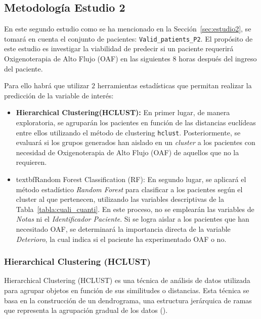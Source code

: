 \subsection{Metodología Estudio 2}\label{sec:metodologia-estudio-2}

En este segundo estudio como se ha mencionado en la Sección~\ref{sec:estudio2}, se tomará en cuenta el conjunto de pacientes: \texttt{Valid\_patients\_P2}. El propósito de este estudio es investigar la viabilidad de predecir si un paciente requerirá Oxigenoterapia de Alto Flujo (OAF) en las siguientes $8$ horas después del ingreso del paciente.

Para ello habrá que utilizar $2$ herramientas estadísticas que permitan realizar la predicción de la variable de interés:

\begin{itemize}
    \item \textbf{Hierarchical Clustering(HCLUST):} En primer lugar, de manera exploratoria, se agruparán los pacientes en función de las distancias euclídeas entre ellos utilizando el método de clustering \texttt{hclust}. Posteriormente, se evaluará si los grupos generados han aislado en un \textit{cluster} a los pacientes con necesidad de Oxigenoterapia de Alto Flujo (OAF) de aquellos que no la requieren.
    \item textbf{Random Forest Classification (RF):} En segundo lugar, se aplicará el método estadístico \textit{Random Forest} para clasificar a los pacientes según el cluster al que pertenecen, utilizando las variables descriptivas de la Tabla~\ref{tabla:cuali_cuanti}. En este proceso, no se emplearán las variables de \textit{Notas} ni el \textit{Identificador Paciente}. Si se logra aislar a los pacientes que han necesitado OAF, se determinará la importancia directa de la variable \textit{Deterioro}, la cual indica si el paciente ha experimentado OAF o no.
\end{itemize}

\subsubsection{Hierarchical Clustering (HCLUST)}\label{sec:hclust}

Hierarchical Clustering (HCLUST) es una técnica de análisis de datos utilizada para agrupar objetos en función de sus similitudes o distancias. Esta técnica se basa en la construcción de un dendrograma, una estructura jerárquica de ramas que representa la agrupación gradual de los datos (\cite{jain1988algorithms}).

